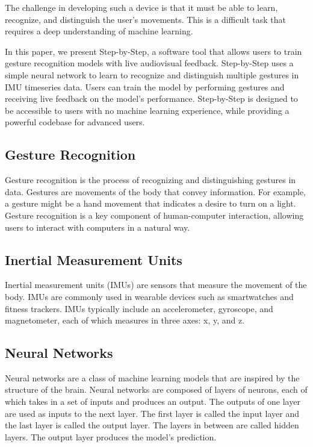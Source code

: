 \documentclass{article}
\begin{document}
The challenge in developing such a device is that it must be able to learn, recognize, and distinguish the user's movements. This is a difficult task that requires a deep understanding of machine learning. 

In this paper, we present Step-by-Step, a software tool that allows users to train gesture recognition models with live audiovisual feedback. Step-by-Step uses a simple neural network to learn to recognize and distinguish multiple gestures in IMU timeseries data. Users can train the model by performing gestures and receiving live feedback on the model's performance. Step-by-Step is designed to be accessible to users with no machine learning experience, while providing a powerful codebase for advanced users.


\subsection{Gesture Recognition}
Gesture recognition is the process of recognizing and distinguishing gestures in data. Gestures are movements of the body that convey information. For example, a gesture might be a hand movement that indicates a desire to turn on a light. Gesture recognition is a key component of human-computer interaction, allowing users to interact with computers in a natural way.

\subsection{Inertial Measurement Units}
Inertial measurement units (IMUs) are sensors that measure the movement of the body. IMUs are commonly used in wearable devices such as smartwatches and fitness trackers. IMUs typically include an accelerometer, gyroscope, and magnetometer, each of which measures in three axes: x, y, and z.

\subsection{Neural Networks}
Neural networks are a class of machine learning models that are inspired by the structure of the brain. Neural networks are composed of layers of neurons, each of which takes in a set of inputs and produces an output. The outputs of one layer are used as inputs to the next layer. The first layer is called the input layer and the last layer is called the output layer. The layers in between are called hidden layers. The output layer produces the model's prediction.
\end{document}
